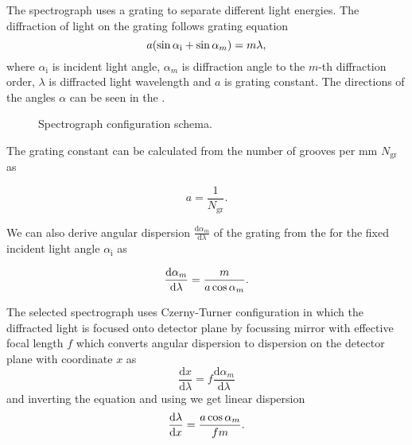 The spectrograph uses a grating to separate different light energies. The
diffraction of light on the grating follows grating equation
\begin{equation}
	a(\sin\alpha_\text{i} + \sin\alpha_m) = m\lambda,
	\label{\eqnlabel{spectrograph_selection:grating_equation}}
\end{equation}
where $\alpha_\text{i}$ is incident light angle, $\alpha_m$ is diffraction
angle to the $m$-th diffraction order, $\lambda$ is diffracted light wavelength
and $a$ is grating constant. The directions of the angles $\alpha$ can be seen
in the
.

\begin{figure}
	\centering
	
	\caption{Spectrograph configuration schema.}
	\label{\figlabel{spectrograph_selection:configuration_schema}}
\end{figure}

The grating constant can be calculated from the number of grooves per mm
$N_\text{gr}$ as

\begin{equation*}
	a = \frac{1}{N_\text{gr}}.
\end{equation*}

We can also derive angular dispersion
$\frac{\text{d}\alpha_m}{\text{d}\lambda}$
of the grating from the
for the fixed incident light angle $\alpha_\text{i}$ as

\begin{equation}
	\frac{\text{d}\alpha_m}{\text{d}\lambda} = \frac{m}{a\cos\alpha_m}.
	\label{\eqnlabel{spectrograph_selection:angular_dispersion}}
\end{equation}

The selected spectrograph uses Czerny-Turner configuration in which the
diffracted light is focused onto detector plane by focussing mirror with
effective focal length $f$ which converts angular dispersion to dispersion on
the detector plane with coordinate $x$ as
\begin{equation*}
	\frac{\text{d}x}{\text{d}\lambda} =
		f\frac{\text{d}\alpha_m}{\text{d}\lambda}
\end{equation*}
and inverting the equation and using
we get linear dispersion
\begin{equation}
	\frac{\text{d}\lambda}{\text{d}x} = \frac{a\cos\alpha_m}{fm}.
	\label{\eqnlabel{spectrograph_selection:linear_dispersion}}
\end{equation}


